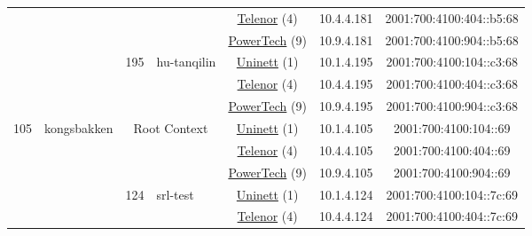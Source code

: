 \begin{small}
\begin{center}
\begin{longtable}{|c|c|c|c|c|c|c|c|}
  &  &  &  & \multicolumn{2}{|c|}{\tiny{\href{https://www.telenor.no}{Telenor} (4)}} & \tiny{10.4.4.181} & \tiny{2001:700:4100:404::b5:68} \\* \cline{5-5}\cline{6-6}\cline{7-7}\cline{8-8}
  &  &  &  & \multicolumn{2}{|c|}{\tiny{\href{http://www.powertech.no}{PowerTech} (9)}} & \tiny{10.9.4.181} & \tiny{2001:700:4100:904::b5:68} \\* \cline{3-3}\cline{4-4}\cline{5-5}\cline{6-6}\cline{7-7}\cline{8-8}
  &  & \multirow{3}{*}{\tiny{195}} & \multicolumn{1}{|l|}{\multirow{3}{*}{\tiny{hu-tanqilin}}} & \multicolumn{2}{|c|}{\tiny{\href{https://www.uninett.no}{Uninett} (1)}} & \tiny{10.1.4.195} & \tiny{2001:700:4100:104::c3:68} \\* \cline{5-5}\cline{6-6}\cline{7-7}\cline{8-8}
  &  &  &  & \multicolumn{2}{|c|}{\tiny{\href{https://www.telenor.no}{Telenor} (4)}} & \tiny{10.4.4.195} & \tiny{2001:700:4100:404::c3:68} \\* \cline{5-5}\cline{6-6}\cline{7-7}\cline{8-8}
  &  &  &  & \multicolumn{2}{|c|}{\tiny{\href{http://www.powertech.no}{PowerTech} (9)}} & \tiny{10.9.4.195} & \tiny{2001:700:4100:904::c3:68} \\ \hline
 \multirow{33}{*}{\tiny{105}} & \multicolumn{1}{|l|}{\multirow{33}{*}{\tiny{kongsbakken}}} & \multicolumn{2}{|c|}{\multirow{3}{*}{\tiny{Root Context}}} & \multicolumn{2}{|c|}{\tiny{\href{https://www.uninett.no}{Uninett} (1)}} & \tiny{10.1.4.105} & \tiny{2001:700:4100:104::69} \\* \cline{5-5}\cline{6-6}\cline{7-7}\cline{8-8}
  &  & \multicolumn{2}{|c|}{} & \multicolumn{2}{|c|}{\tiny{\href{https://www.telenor.no}{Telenor} (4)}} & \tiny{10.4.4.105} & \tiny{2001:700:4100:404::69} \\* \cline{5-5}\cline{6-6}\cline{7-7}\cline{8-8}
  &  & \multicolumn{2}{|c|}{} & \multicolumn{2}{|c|}{\tiny{\href{http://www.powertech.no}{PowerTech} (9)}} & \tiny{10.9.4.105} & \tiny{2001:700:4100:904::69} \\* \cline{3-3}\cline{4-4}\cline{5-5}\cline{6-6}\cline{7-7}\cline{8-8}
  &  & \multirow{3}{*}{\tiny{124}} & \multicolumn{1}{|l|}{\multirow{3}{*}{\tiny{srl-test}}} & \multicolumn{2}{|c|}{\tiny{\href{https://www.uninett.no}{Uninett} (1)}} & \tiny{10.1.4.124} & \tiny{2001:700:4100:104::7c:69} \\* \cline{5-5}\cline{6-6}\cline{7-7}\cline{8-8}
  &  &  &  & \multicolumn{2}{|c|}{\tiny{\href{https://www.telenor.no}{Telenor} (4)}} & \tiny{10.4.4.124} & \tiny{2001:700:4100:404::7c:69} \\* \cline{5-5}\cline{6-6}\cline{7-7}\cline{8-8}

\end{longtable}
\end{center}
\end{small}
